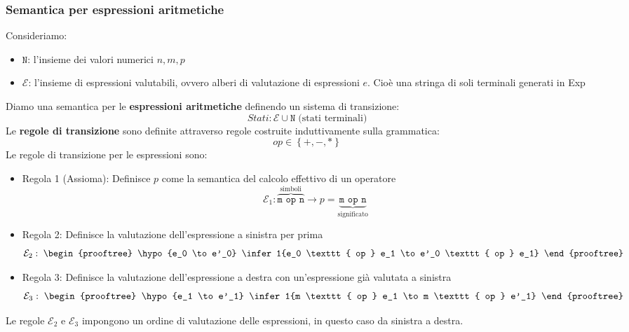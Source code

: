 \documentclass[a4paper]{article}
\begin{document}
\subsubsection{Semantica per espressioni aritmetiche}
Consideriamo:
\begin{itemize}
  \item \( \texttt{N} \): l'insieme dei valori numerici \( n, m, p \) 
  \item \( \mathcal{E} \): l'insieme di espressioni valutabili, ovvero alberi di
    valutazione di espressioni \( e \). Cioè una stringa di soli terminali generati
    in Exp
\end{itemize}

\vspace{1em}
\noindent
Diamo una semantica per le \textbf{espressioni aritmetiche} definendo un sistema di transizione:
\[
  Stati: \mathcal{E} \cup \texttt{N} \; \text{(stati terminali)}
\] 
Le \textbf{regole di transizione} sono definite attraverso regole costruite
induttivamente sulla grammatica:
\[
  op \in \left\{ +, -, * \right\}
\] 
Le regole di transizione per le espressioni sono:
\begin{itemize}
  \item Regola 1 (Assioma): Definisce \( p \) come la semantica del calcolo
    effettivo di un operatore
    \[
      \mathcal{E}_1: \overbrace{\texttt{m op n}}^{\text{simboli}} \to p
      = \underbrace{\texttt{m op n}}_{\text{significato}}
    \] 

  \item Regola 2: Definisce la valutazione dell'espressione a sinistra per prima
    \[ \mathcal{E}_2:\; 
      \begin{prooftree}
        \hypo{e_0 \to e'_0}
        \infer1{e_0 \texttt{ op } e_1 \to e'_0 \texttt{ op } e_1}
      \end{prooftree}
    \]

  \item Regola 3: Definisce la valutazione dell'espressione a destra con un'espressione
    già valutata a sinistra
    \[ \mathcal{E}_3:\;
      \begin{prooftree}
        \hypo{e_1 \to e'_1}
        \infer1{m \texttt{ op } e_1 \to m \texttt{ op } e'_1}
      \end{prooftree}
    \] 
\end{itemize}
Le regole \( \mathcal{E}_2 \) e \( \mathcal{E}_3 \) impongono un ordine di valutazione
delle espressioni, in questo caso da sinistra a destra.
\end{document}
